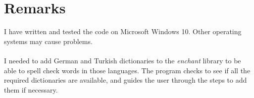 \documentclass[11pt,a4paper,leqno]{article}
\theoremstyle{definition}
\begin{document}
    \newpage

    \section{Remarks}
    
    I have written and tested the code on Microsoft Windows 10. Other operating systems may cause problems.\\\\
    I needed to add German and Turkish dictionaries to the \emph{enchant} library to be able to spell check words in those languages.
    The program checks to see if all the required dictionaries are available, and guides the user through the steps to add them if necessary.
\end{document}
